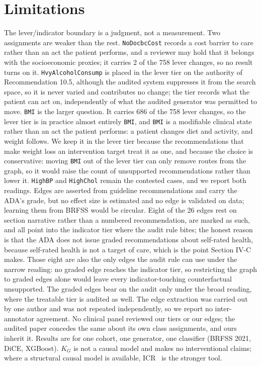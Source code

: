 \documentclass[conference]{IEEEtran}
\begin{document}
\section{Limitations}
The lever/indicator boundary is a judgment, not a measurement. Two assignments are weaker than the rest. \texttt{NoDocbcCost} records a cost barrier to care rather than an act the patient performs, and a reviewer may hold that it belongs with the socioeconomic proxies; it carries 2 of the 758 lever changes, so no result turns on it. \texttt{HvyAlcoholConsump} is placed in the lever tier on the authority of Recommendation 10.5, although the audited system suppresses it from the search space, so it is never varied and contributes no change; the tier records what the patient can act on, independently of what the audited generator was permitted to move. \texttt{BMI} is the larger question. It carries 686 of the 758 lever changes, so the lever tier is in practice almost entirely \texttt{BMI}, and \texttt{BMI} is a modifiable clinical state rather than an act the patient performs: a patient changes diet and activity, and weight follows. We keep it in the lever tier because the recommendations that make weight loss an intervention target treat it as one, and because the choice is conservative: moving \texttt{BMI} out of the lever tier can only remove routes from the graph, so it would raise the count of unsupported recommendations rather than lower it. \texttt{HighBP} and \texttt{HighChol} remain the contested cases, and we report both readings. Edges are asserted from guideline recommendations and carry the ADA's grade, but no effect size is estimated and no edge is validated on data; learning them from BRFSS would be circular. Eight of the 26 edges rest on section narrative rather than a numbered recommendation, are marked as such, and all point into the indicator tier where the audit rule bites; the honest reason is that the ADA does not issue graded recommendations about self-rated health, because self-rated health is not a target of care, which is the point Section IV-C makes. Those eight are also the only edges the audit rule can use under the narrow reading: no graded edge reaches the indicator tier, so restricting the graph to graded edges alone would leave every indicator-touching counterfactual unsupported. The graded edges bear on the audit only under the broad reading, where the treatable tier is audited as well. The edge extraction was carried out by one author and was not repeated independently, so we report no inter-annotator agreement. No clinical panel reviewed our tiers or our edges; the audited paper concedes the same about its own class assignments, and ours inherit it. Results are for one cohort, one generator, one classifier (BRFSS 2021, DiCE, XGBoost). $K_G$ is not a causal model and makes no interventional claims; where a structural causal model is available, ICR~\cite{konig2023} is the stronger tool.
\end{document}
